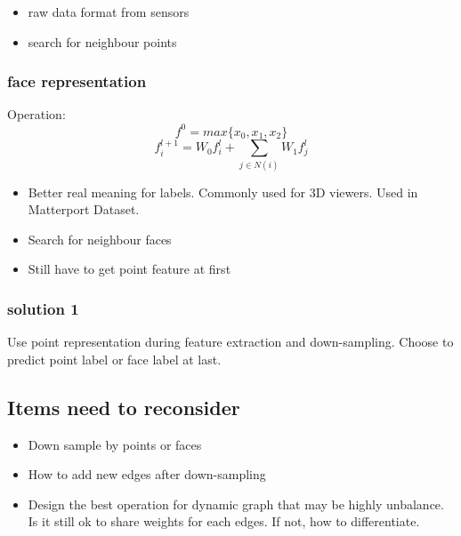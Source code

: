 \documentclass[,table,dvipsnames]{article}
\begin{document}
\begin{itemize}
	\item raw data format from sensors
	\item search for neighbour points
\end{itemize}

\subsubsection{face representation}
Operation:
$$f^0 = max\{x_0, x_1, x_2\}$$
$$f_i^{l+1} = W_0f_i^l + \sum_{j\in N(i)}W_1 f_j^l$$
\par \noindent

\begin{itemize}
	\item Better real meaning for labels. Commonly used for 3D viewers. Used in Matterport Dataset.
	\item Search for neighbour faces
	\item Still have to get point feature at first
\end{itemize}

\subsubsection{solution 1}
Use point representation during feature extraction and down-sampling. Choose to predict point label or face label at last. 

\subsection{Items need to reconsider}
\begin{itemize}
	\item Down sample by points or faces
	\item How to add new edges after down-sampling
	\item Design the best operation for dynamic graph that may be highly unbalance. Is it still ok to share weights for each edges. If not, how to differentiate.
\end{itemize}
\end{document}
